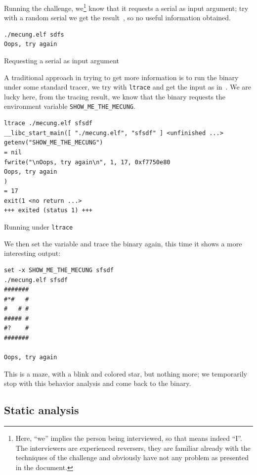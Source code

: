 \documentclass{easychair}
\begin{document}
Running the challenge, we\footnote{Here, ``we'' implies the person being interviewed, so that means indeed ``I''. The interviewers are experienced reversers, they are familiar already with the techniques of the challenge and obviously have not any problem as presented in the document.} know that it requests a serial as input argument; try with a random serial we get the result~, so no useful information obtained.
\begin{listing}[h]
  \begin{verbatim}
./mecung.elf sdfs
Oops, try again
  \end{verbatim}
  \caption{Requesting a serial as input argument}
  \label{fig:serial_request}
\end{listing}
A traditional approach in trying to get more information is to run the binary under some standard tracer, we try with \texttt{ltrace} and get the input as in~. We are lucky here, from the tracing result, we know that the binary requests the environment variable \texttt{SHOW\_ME\_THE\_MECUNG}.
\begin{listing}[h]
  \begin{verbatim}
ltrace ./mecung.elf sfsdf
__libc_start_main([ "./mecung.elf", "sfsdf" ] <unfinished ...>
getenv("SHOW_ME_THE_MECUNG")                                                                                           = nil
fwrite("\nOops, try again\n", 1, 17, 0xf7750e80
Oops, try again
)                                                                       = 17
exit(1 <no return ...>
+++ exited (status 1) +++
  \end{verbatim}
  \caption{Running under \texttt{ltrace}}
  \label{fig:running_ltrace}
\end{listing}
We then set the variable and trace the binary again, this time it shows a more interesting output:
\begin{listing}[h]
  \begin{verbatim}
set -x SHOW_ME_THE_MECUNG sfsdf
./mecung.elf sfsdf
#######
#*#   #
#   # #
##### #
#?    #
#######

Oops, try again
  \end{verbatim}
\end{listing}

This is a maze, with a blink and colored star, but nothing more; we temporarily stop with this behavior analysis and come back to the binary.

\subsection{Static analysis}
\label{sec:static_analysis_quick}
\end{document}
